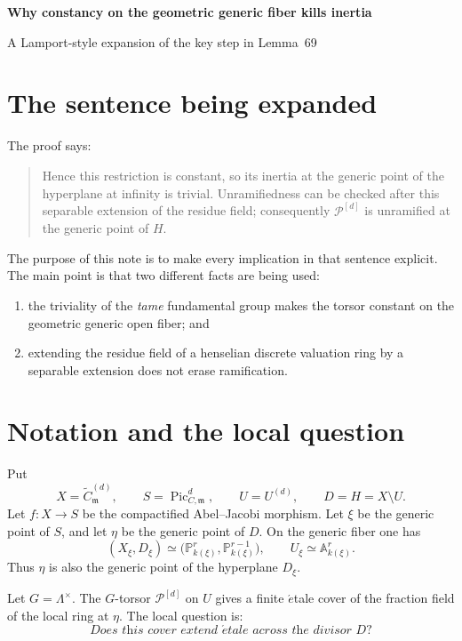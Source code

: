 \documentclass[11pt]{article}
\newcommand{\cP}{\mathcal P}
\newcommand{\PicM}{\operatorname{Pic}^{d}_{C,\mathfrak m}}
\begin{document}
\begin{center}
  {\Large\bfseries Why constancy on the geometric generic fiber kills inertia}\par
  \vspace{4pt}
  {\large A Lamport-style expansion of the key step in Lemma~69}
\end{center}

\section*{The sentence being expanded}

The proof says:
\begin{quote}
Hence this restriction is constant, so its inertia at the generic point of
the hyperplane at infinity is trivial. Unramifiedness can be checked after
this separable extension of the residue field; consequently
$\cP^{[d]}$ is unramified at the generic point of $H$.
\end{quote}

The purpose of this note is to make every implication in that sentence
explicit.  The main point is that two different facts are being used:
\begin{enumerate}[label=(\roman*),leftmargin=2em]
  \item the triviality of the \emph{tame} fundamental group makes the
        torsor constant on the geometric generic open fiber; and
  \item extending the residue field of a henselian discrete valuation ring
        by a separable extension does not erase ramification.
\end{enumerate}

\section*{Notation and the local question}

Put
\[
  X=\widetilde C^{(d)}_{\mathfrak m},\qquad
  S=\PicM,\qquad
  U=U^{(d)},\qquad
  D=H=X\setminus U.
\]
Let $f\colon X\to S$ be the compactified Abel--Jacobi morphism.  Let
$\xi$ be the generic point of $S$, and let $\eta$ be the generic point of
$D$.  On the generic fiber one has
\[
  (X_\xi,D_\xi)\simeq
  \bigl(\mathbb P^r_{k(\xi)},\mathbb P^{r-1}_{k(\xi)}\bigr),
  \qquad U_\xi\simeq\mathbb A^r_{k(\xi)}.
\]
Thus $\eta$ is also the generic point of the hyperplane $D_\xi$.

Let $G=\Lambda^\times$.  The $G$-torsor $\cP^{[d]}$ on $U$ gives a
finite \(\acute{e}\)tale cover of the fraction field of the local ring at
$\eta$.  The local question is:
\[
  \textit{Does this cover extend \(\acute{e}\)tale across the divisor $D$?}
\]
\end{document}
